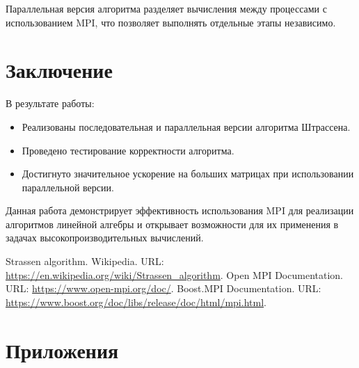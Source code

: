 \documentclass{report}
\begin{document}
Параллельная версия алгоритма разделяет вычисления между процессами с использованием MPI, что позволяет выполнять отдельные этапы независимо.

\newpage

\section*{Заключение} 
В результате работы:
\begin{itemize}
\item Реализованы последовательная и параллельная версии алгоритма Штрассена.
\item Проведено тестирование корректности алгоритма.
\item Достигнуто значительное ускорение на больших матрицах при использовании параллельной версии.
\end{itemize}

Данная работа демонстрирует эффективность использования MPI для реализации алгоритмов линейной алгебры и открывает возможности для их применения в задачах высокопроизводительных вычислений.

\newpage

\begin{thebibliography}{1}
 Strassen algorithm. Wikipedia. URL: \url{https://en.wikipedia.org/wiki/Strassen_algorithm}.
 Open MPI Documentation. URL: \url{https://www.open-mpi.org/doc/}.
 Boost.MPI Documentation. URL: \url{https://www.boost.org/doc/libs/release/doc/html/mpi.html}.
\end{thebibliography}

\newpage

\section*{Приложения}
\end{document}
